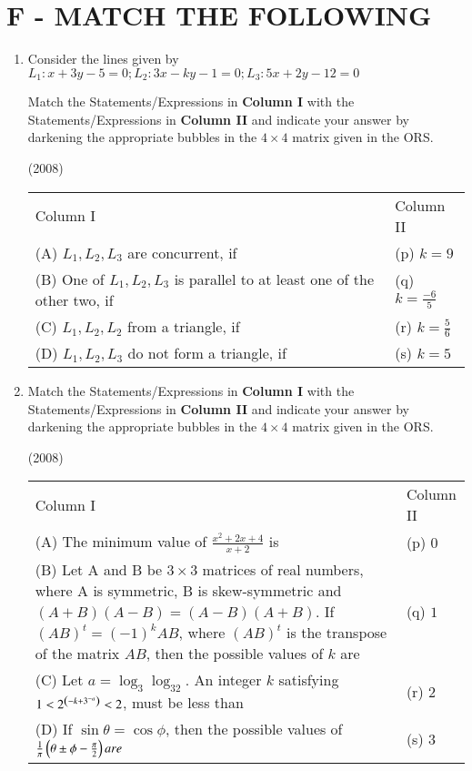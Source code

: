 \documentclass[journal,12pt,twocolumn]{IEEEtran}
\theoremstyle{remark}
\begin{document}
\section*{F - MATCH THE FOLLOWING}
\bigskip
\begin{enumerate}
	\item Consider the lines given by
		$L_1:x+3y-5=0; L_2:3x-ky-1=0; L_3:5x+2y-12=0$

		Match the Statements/Expressions in \textbf{Column I} with the Statements/Expressions in \textbf{Column II} and indicate your answer by darkening the appropriate bubbles in the $4\times4$ matrix given in the ORS.

		\hfill(2008)

		\begin{tabular}{p{12cm} p{3cm}}
			Column I & Column II \\
			(A) $L_1,L_2,L_3$ are concurrent, if & (p) $k=9$ \\
			(B) One of $L_1,L_2,L_3$ is parallel to at least one of the other two, if & (q) $k=\frac{-6}{5}$ \\
			(C) $L_1,L_2,L_2$ from a triangle, if & (r) $k=\frac{5}{6}$ \\
			(D) $L_1,L_2,L_3$ do not form a triangle, if & (s) $k=5$
		\end{tabular}


	\item  Match the Statements/Expressions in \textbf{Column I} with the Statements/Expressions in \textbf{Column II} and indicate your answer by darkening the appropriate bubbles in the $4\times4$ matrix given in the ORS.

		\hfill(2008)

		\begin{tabular}{p{12cm} p{3cm}}
			Column I & Column II \\
			(A) The minimum value of $\frac{x^2+2x+4}{x+2}$ is & (p) $0$ \\
			(B) Let A and B be $3\times3$ matrices of real numbers, where A is symmetric, B is skew-symmetric and $(A+B)(A-B)=(A-B)(A+B)$. If $(AB)^t=(-1)^kAB$, where $(AB)^t$ is the transpose of the matrix $AB$, then the possible values of $k$ are & (q) $1$ \\
			(C) Let $a=\log_3\log_32$. An integer $k$ satisfying $1<2^{\left(-k+3^{-a}\right)}<2$, must be less than & (r) $2$ \\
			(D) If $\sin\theta=\cos\phi$, then the possible values of $\frac{1}{\pi}\left(\theta\pm\phi-\frac{\pi}{2}\right) are $ & (s) $3$
		\end{tabular}
\end{enumerate}
\end{document}
